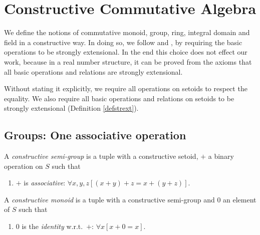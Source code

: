 
\section{Constructive Commutative Algebra}
We define the notions of commutative monoid, group, ring, integral
domain and field in a constructive way. In doing so, we follow
\cite{Ruit82} and \cite{TvD882}, by requiring the basic operations to
be strongly extensional. In the end this choice does not effect our
work, because in a real number structure, it can be proved from the
axioms that all basic operations and relations are strongly
extensional.

\begin{convention}\label{convstrext}
Without stating it explicitly, we require all operations on setoids to respect
the equality.
We also require all basic operations and relations on setoids to be
strongly extensional (Definition \ref{defstrext}).
\end{convention}

\subsection{Groups: One associative operation}
\begin{definition}\label{defsemigrp}
A {\em constructive semi-group\/} is a tuple  with
 a constructive setoid, $+$ a binary operation on
$S$ such that
  \begin{enumerate}
  \item $+$ is {\em associative}: $\forall x, y,z[(x+y)+z = x+(y+z)]$.
   \end{enumerate}
\end{definition}

\begin{definition}\label{defmonoid}
A {\em constructive monoid\/} is a tuple  with
 a constructive semi-group and $0$ an element of
$S$ such that
  \begin{enumerate}
  \item $0$ is the {\em identity\/} w.r.t.\ $+$: $\forall x[x+0=x]$.
  \end{enumerate}
\end{definition}

